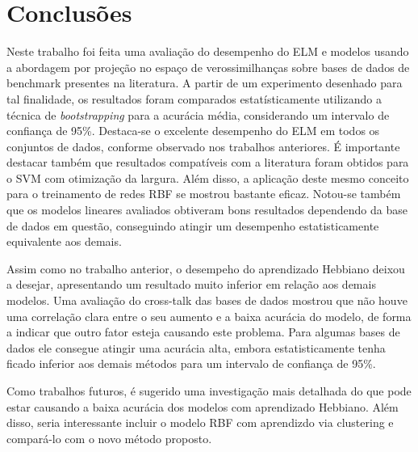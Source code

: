 \documentclass[conference]{IEEEtran}
\begin{document}
	
	\section{Conclusões}
	
	Neste trabalho foi feita uma avaliação do desempenho do ELM e modelos usando a abordagem por projeção no espaço de verossimilhanças sobre bases de dados de benchmark presentes na literatura. A partir de um experimento desenhado para tal finalidade, os resultados foram comparados estatísticamente utilizando a técnica de \textit{bootstrapping} para a acurácia média, considerando um intervalo de confiança de 95\%. Destaca-se o excelente desempenho do ELM em todos os conjuntos de dados, conforme observado nos trabalhos anteriores. É importante destacar também que resultados compatíveis com a literatura foram obtidos para o SVM com otimização da largura. Além disso, a aplicação deste mesmo conceito para o treinamento de redes RBF se mostrou bastante eficaz. Notou-se também que os modelos lineares avaliados obtiveram bons resultados dependendo da base de dados em questão, conseguindo atingir um desempenho estatisticamente equivalente aos demais.
	
	Assim como no trabalho anterior, o desempeho do aprendizado Hebbiano deixou a desejar, apresentando um resultado muito inferior em relação aos demais modelos. Uma avaliação do cross-talk das bases de dados mostrou que não houve uma correlação clara entre o seu aumento e a baixa acurácia do modelo, de forma a indicar que outro fator esteja causando este problema. Para algumas bases de dados ele consegue atingir uma acurácia alta, embora estatisticamente tenha ficado inferior aos demais métodos para um intervalo de confiança de 95\%.
	
	Como trabalhos futuros, é sugerido uma investigação mais detalhada do que pode estar causando a baixa acurácia dos modelos com aprendizado Hebbiano. Além disso, seria interessante incluir o modelo RBF com aprendizdo via clustering e compará-lo com o novo método proposto. 
		


    
	
	
\end{document}
